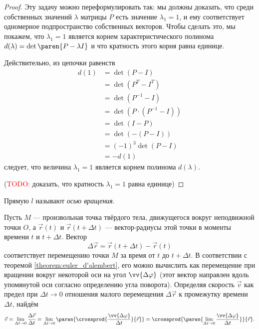 \begin{proof}
  Эту задачу можно переформулировать так: мы должны доказать, что среди
  собственных значений $\lambda$ матрицы $P$ есть значение $\lambda_1 = 1$, и
  ему соответствует одномерное подпространство собственных векторов. Чтобы
  сделать это, мы покажем, что $\lambda_1 = 1$ является корнем
  характеристического полинома $d(\lambda) = \det \paren{P - \lambda I}$ и что
  кратность этого корня равна единице.

  Действительно, из цепочки равенств
  \begin{equation*}
    \begin{aligned}
      d(1) &= \det(P - I) \\
      &= \det(P^T - I^T) \\
      &= \det(P^{-1} - I) \\
      &= \det(P \cdot (P^{-1} - I)) \\
      &= \det(I - P) \\
      &= \det(-(P - I)) \\
      &= (-1)^3 \det(P - I) \\
      &= -d(1)
    \end{aligned}
  \end{equation*}
  следует, что величина $\lambda_1 = 1$ является корнем полинома $d(\lambda)$.

  (\textcolor{red}{TODO:} доказать, что кратность $\lambda_1 = 1$ равна единице)
\end{proof}

\begin{definition}
  Прямую $l$ называют \textit{осью вращения}.
\end{definition}

Пусть $M$ --- произвольная точка твёрдого тела, движущегося вокруг неподвижной
точки $O$, а $\vec{r}(t)$ и $\vec{r}(t + \Delta t)$ --- вектор-радиусы этой
точки в моменты времени $t$ и $t + \Delta t$. Вектор
\begin{equation*}
  \Delta \vec{r} = \vec{r}(t + \Delta t) - \vec{r}(t)
\end{equation*}
соответствует перемещению точки $M$ за время от $t$ до $t + \Delta t$. В
соответствии с теоремой \ref{theorem:euler_d'alembert}, его можно вычислить как
перемещение при вращении вокруг некоторой оси на угол $\vv{\Delta \varphi}$
(этот вектор направлен вдоль упомянутой оси согласно определению угла поворота).
Определяя скорость $\vec{v}$ как предел при $\Delta t \to 0$ отношения малого
перемещения $\Delta \vec{r}$ к промежутку времени $\Delta t$, найдём
\begin{equation*}
  \vec{v} = \lim_{\Delta t \to 0} \frac{\Delta \vec{r}}{\Delta t} = \lim_{\Delta
    t \to 0} \paren{\crossprod{\frac{\vv{\Delta \varphi}}{\Delta t}}{\vec{r}}}
    = \crossprod{\paren{\lim_{\Delta t \to 0} \frac{\vv{\Delta \varphi}}{\Delta
    t}}}{\vec{r}}.
\end{equation*}

